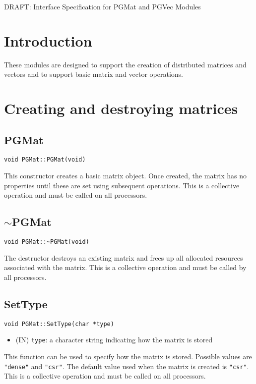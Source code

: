 \documentclass[12pt]{article}
\begin{document}
\begin{titlepage}
\begin{center}
{\LARGE DRAFT: Interface Specification for PGMat and PGVec Modules}
\end{center}
\end{titlepage}
\newpage
\pagestyle{plain}
\section{Introduction}
These modules are designed to support the creation of distributed matrices
and vectors and to support basic matrix and vector operations.
\section{Creating and destroying matrices}
\subsection{PGMat}
\begin{verbatim}
void PGMat::PGMat(void)
\end{verbatim}
This constructor creates a basic matrix object. Once created, the matrix has no
properties until these are set using subsequent operations. This is a collective
operation and must be called on all processors.
\subsection{$\sim$PGMat}
\begin{verbatim}
void PGMat::~PGMat(void)
\end{verbatim}
The destructor destroys an existing matrix and frees up all allocated resources
associated with the matrix. This is a collective operation and must be called by
all processors.
\subsection{SetType}
\begin{verbatim}
void PGMat::SetType(char *type)
\end{verbatim}
\begin{itemize}
\item (IN) \texttt{type}: a character string indicating how the matrix is stored
\end{itemize}
This function can be used to specify how the matrix is stored. Possible values
are \texttt{"dense"} and \texttt{"csr"}. The default value used when the matrix
is created is \texttt{"csr"}. This is a collective operation and must be called
on all processors.
\end{document}
